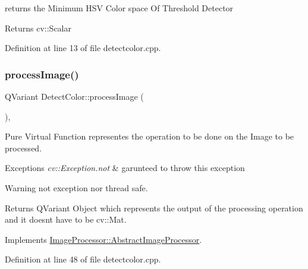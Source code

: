 returns the Minimum H\+SV Color space Of Threshold Detector 

\begin{DoxyReturn}{Returns}
cv\+::\+Scalar 
\end{DoxyReturn}


Definition at line 13 of file detectcolor.\+cpp.

\mbox{\label{class_image_processor_1_1_detect_color_afb14622f8e1390f1cf887cc8bf1da568}} 
\subsubsection{\texorpdfstring{process\+Image()}{processImage()}}
{\footnotesize\ttfamily Q\+Variant Detect\+Color\+::process\+Image (\begin{DoxyParamCaption}{ }\end{DoxyParamCaption})\hspace{0.3cm}{\ttfamily [override]}, {\ttfamily [virtual]}}



Pure Virtual Function representes the operation to be done on the Image to be processed. 


\begin{DoxyExceptions}{Exceptions}
{\em cv\+::\+Exception.\+not} & garunteed to throw this exception \\
\hline
\end{DoxyExceptions}
\begin{DoxyWarning}{Warning}
not exception nor thread safe. 
\end{DoxyWarning}
\begin{DoxyReturn}{Returns}
Q\+Variant Object which represents the output of the processing operation and it doesn\textquotesingle{}t have to be cv\+::\+Mat. 
\end{DoxyReturn}


Implements \hyperlink{class_image_processor_1_1_abstract_image_processor_ad033ae911918b0f6842b7b1d6cdd2b90}{Image\+Processor\+::\+Abstract\+Image\+Processor}.



Definition at line 48 of file detectcolor.\+cpp.

\mbox{\label{class_image_processor_1_1_detect_color_a71bfe53fe223a7342e17e64adf483b84}} 
